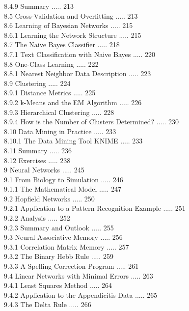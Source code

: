 \documentclass[10pt]{book}
\begin{document}
8.4.9 Summary ..... 213\\
8.5 Cross-Validation and Overfitting ..... 213\\
8.6 Learning of Bayesian Networks ..... 215\\
8.6.1 Learning the Network Structure ..... 215\\
8.7 The Naive Bayes Classifier ..... 218\\
8.7.1 Text Classification with Naive Bayes ..... 220\\
8.8 One-Class Learning ..... 222\\
8.8.1 Nearest Neighbor Data Description ..... 223\\
8.9 Clustering ..... 224\\
8.9.1 Distance Metrics ..... 225\\
8.9.2 k-Means and the EM Algorithm ..... 226\\
8.9.3 Hierarchical Clustering ..... 228\\
8.9.4 How is the Number of Clusters Determined? ..... 230\\
8.10 Data Mining in Practice ..... 233\\
8.10.1 The Data Mining Tool KNIME ..... 233\\
8.11 Summary ..... 236\\
8.12 Exercises ..... 238\\
9 Neural Networks ..... 245\\
9.1 From Biology to Simulation ..... 246\\
9.1.1 The Mathematical Model ..... 247\\
9.2 Hopfield Networks ..... 250\\
9.2.1 Application to a Pattern Recognition Example ..... 251\\
9.2.2 Analysis ..... 252\\
9.2.3 Summary and Outlook ..... 255\\
9.3 Neural Associative Memory ..... 256\\
9.3.1 Correlation Matrix Memory ..... 257\\
9.3.2 The Binary Hebb Rule ..... 259\\
9.3.3 A Spelling Correction Program ..... 261\\
9.4 Linear Networks with Minimal Errors ..... 263\\
9.4.1 Least Squares Method ..... 264\\
9.4.2 Application to the Appendicitis Data ..... 265\\
9.4.3 The Delta Rule ..... 266\\
\end{document}
